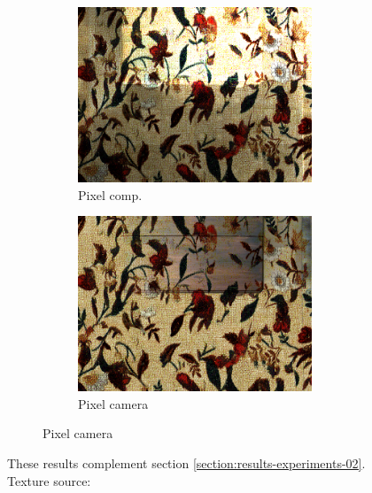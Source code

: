 \begin{figure}[]
\begin{subfigure}{\textwidth}
\begin{subfigure}{0.24\textwidth}
            \includegraphics[width=\textwidth]{images/04-experiment02/carpet/flowers2/pixel_im.jpg}
            \caption*{Pixel comp.}
        \end{subfigure}
        \hfill
        \begin{subfigure}{0.24\textwidth}
            \centering
            \includegraphics[width=\textwidth]{images/04-experiment02/carpet/flowers2/pixel_proj.jpg}
            \caption*{Pixel camera}
        \end{subfigure}
    \end{subfigure}
    \caption{These results complement section \ref{section:results-experiments-02}. Texture source: \citet{Pixar128}}
    \label{fig:ex02-complete-carpet-flowers_flowers2}
\end{figure}

